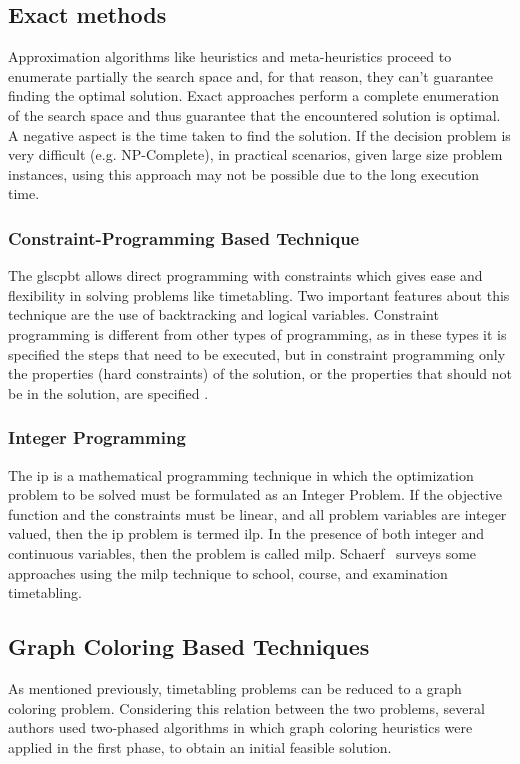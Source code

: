 \subsection{Exact methods}
\label{subsection:exactmethods}
Approximation algorithms like heuristics and meta-heuristics proceed to enumerate partially the search space and, for that reason, they can't guarantee finding the optimal solution. Exact approaches perform a complete enumeration of the search space and thus guarantee that the encountered solution is optimal. A negative aspect is the time taken to find the solution. If the decision problem is very difficult (e.g. NP-Complete), in practical scenarios, given large size problem instances, using this approach may not be possible due to the long execution time.\\

\subsubsection{Constraint-Programming Based Technique}
The gls{cpbt} allows direct programming with constraints which gives ease and flexibility in solving problems like timetabling. Two important features about this technique are the use of backtracking and logical variables. Constraint programming is different from other types of programming, as in these types it is specified the steps that need to be executed, but in constraint programming only the properties (hard constraints) of the solution, or the properties that should not be in the solution, are specified \cite{Qu2009}.\\

\subsubsection{Integer Programming}
The \gls{ip} is a mathematical programming technique in which the optimization problem to be solved must be formulated as an Integer Problem. If the objective function and the constraints must be linear, and all problem variables are integer valued, then the \gls{ip} problem is termed \gls{ilp}. In the presence of both integer and continuous variables, then the problem is called \gls{milp}. Schaerf~\cite{Schaerf1999} surveys some approaches using the \gls{milp} technique to school, course, and examination timetabling.\\

\subsection{Graph Coloring Based Techniques}
\label{subsection:graphcoloring}
As mentioned previously, timetabling problems can be reduced to a graph coloring problem. Considering this relation between the two problems, several authors used two-phased algorithms in which graph coloring heuristics were applied in the first phase, to obtain an initial feasible solution.\\

